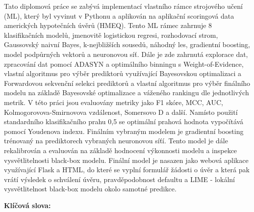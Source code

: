 Tato diplomov\'{a} pr\'{a}ce se zab\'{y}v\'{a} implementac\'{i} vlastn\'{i}ho r\'{a}mce strojov\'{e}ho u\v{c}en\'{i} (ML), kter\'{y} byl vyvinut v Pythonu a aplikov\'{a}n na aplika\v{c}n\'{i} scoringov\'{a} data americk\'{y}ch hypote\v{c}n\'{i}ch \'{u}v\v{e}r\r{u} (HMEQ).
Tento ML r\'{a}mec zahrnuje 8 klasifika\v{c}n\'{i}ch model\r{u}, jmenovit\v{e} logistickou regresi, rozhodovac\'{i} strom, Gaussovsk\'{y} naivn\'{i} Bayes, k-nejbli\v{z}\v{s}\'{i}ch soused\r{u}, n\'{a}hodn\'{y} les, gradientn\'{i} boosting, model podp\r{u}rn\'{y}ch vektor\r{u} a neuronovou s\'{i}\v{t}.
D\'{a}le je zde zahrnut\'{a} explorace dat, zpracov\'{a}n\'{i} dat pomoc\'{i} ADASYN a optim\'{a}ln\'{i}ho binningu s Weight-of-Evidence, vlastn\'{i} algoritmus pro v\'{y}b\v{e}r prediktor\r{u} vyu\v{z}\'{i}vaj\'{i}c\'{i} Bayesovskou optimalizaci a Forwardovou sekven\v{c}n\'{i} selekci prediktor\r{u} a
vlastn\'{i} algoritmus pro v\'{y}b\v{e}r fin\'{a}ln\'{i}ho modelu na z\'{a}klad\v{e} Bayesovsk\'{e} optimalizace a v\'{a}\v{z}en\'{e}ho rankingu dle jednotliv\'{y}ch metrik. V t\'{e}to pr\'{a}ci jsou evaluov\'{a}ny metriky jako F1 sk\'{o}re, MCC, AUC, Kolmogorovova-Smirnovova vzd\'{a}lenost, Somersovo D a dal\v{s}\'{i}.
Nam\'{i}sto pou\v{z}it\'{i} standardn\'{i}ho klasifika\v{c}n\'{i}ho prahu 0,5 se optim\'{a}ln\'{i} prahov\'{a} hodnota vypo\v{c}\'{i}t\'{a}v\'{a} pomoc\'{i} Youdenova indexu.
Fin\'{a}ln\'{i}m vybran\'{y}m modelem je gradientn\'{i} boosting tr\'{e}novan\'{y} na prediktorech vybran\'{y}ch neuronovou s\'{i}\v{t}\'{i}.
Tento model je d\'{a}le rekalibrov\'{a}n a evaluov\'{a}n na z\'{a}klad\v{e} hodnocen\'{i} v\'{y}konnosti modelu a inspekce vysv\v{e}tlitelnosti black-box modelu.
Fin\'{a}ln\'{i} model je nasazen jako webov\'{a} aplikace vyu\v{z}\'{i}vaj\'{i}c\'{i} Flask a HTML, do kter\'{e} se vypln\'{i} formul\'{a}\v{r} \v{z}\'{a}dosti o \'{u}v\v{e}r a kter\'{a} pak vr\'{a}t\'{i} v\'{y}sledek o schv\'{a}len\'{i} \'{u}v\v{e}ru, pravd\v{e}podobnost defaultu a LIME - lok\'{a}ln\'{i} vysv\v{e}tlitelnost black-box modelu okolo samotn\'{e} predikce.

\bigskip

\textbf{Kl\'{i}\v{c}ov\'{a} slova:} \Klic

